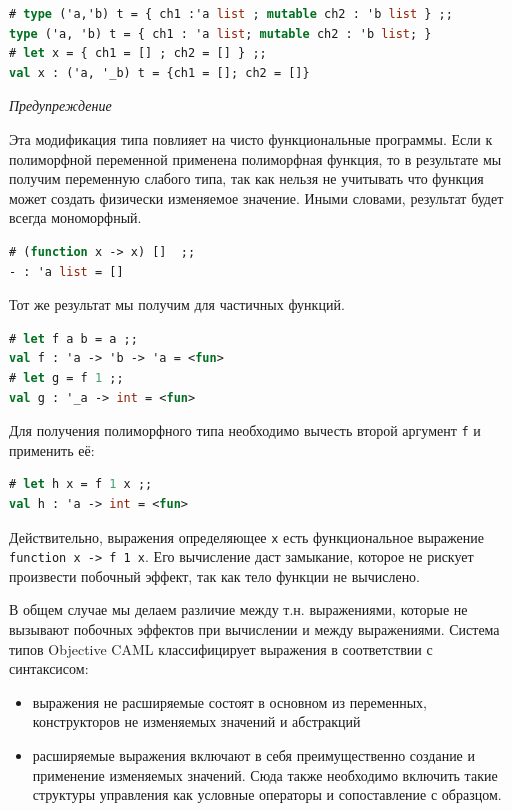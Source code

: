 \begin{lstlisting}[language=OCaml]
# type ('a,'b) t = { ch1 :'a list ; mutable ch2 : 'b list } ;;
type ('a, 'b) t = { ch1 : 'a list; mutable ch2 : 'b list; }
# let x = { ch1 = [] ; ch2 = [] } ;;
val x : ('a, '_b) t = {ch1 = []; ch2 = []}
\end{lstlisting}

{\it Предупреждение}


Эта модификация типа повлияет на чисто функциональные программы.
Если к полиморфной переменной применена полиморфная функция, то в результате мы
получим переменную слабого типа, так как нельзя не учитывать что функция может
создать физически изменяемое значение. Иными словами, результат будет всегда
мономорфный.

\begin{lstlisting}[language=OCaml]
# (function x -> x) []  ;;
- : 'a list = []
\end{lstlisting}

Тот же результат мы получим для частичных функций.

\begin{lstlisting}[language=OCaml]
# let f a b = a ;;
val f : 'a -> 'b -> 'a = <fun>
# let g = f 1 ;;
val g : '_a -> int = <fun>
\end{lstlisting}

Для получения полиморфного типа необходимо вычесть второй аргумент \texttt{f} и
применить её:

\begin{lstlisting}[language=OCaml]
# let h x = f 1 x ;;
val h : 'a -> int = <fun>
\end{lstlisting}

Действительно, выражения определяющее \texttt{x} есть функциональное выражение
\texttt{function x -> f 1 x}. Его вычисление даст замыкание, которое не рискует
произвести побочный эффект, так как тело функции не вычислено.

В общем случае мы делаем различие между т.н.  выражениями,
которые не вызывают побочных эффектов при вычислении и между 
выражениями. Система типов Objective CAML классифицирует выражения в
соответствии с синтаксисом:

\begin{itemize}
	\item выражения не расширяемые состоят в основном из переменных,
конструкторов не изменяемых значений и абстракций

	\item расширяемые выражения включают в себя преимущественно создание и
применение изменяемых значений. Сюда также необходимо включить такие структуры
управления как условные операторы и сопоставление с образцом.
\end{itemize}
